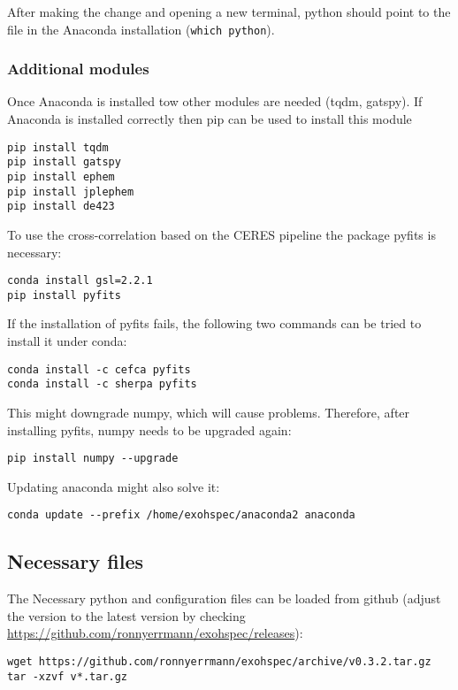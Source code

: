 \documentclass[10pt,a4paper]{article}
\begin{document}
After making the change and opening a new terminal, python should point to the file in the Anaconda installation (\verb|which python|).

\subsubsection{Additional modules}

\noindent Once Anaconda is installed tow other modules are needed (tqdm, gatspy). If Anaconda is installed correctly then pip can be used to install this module
\begin{lstlisting}[style=base]
pip install tqdm
pip install gatspy
pip install ephem
pip install jplephem
pip install de423
\end{lstlisting}

To use the cross-correlation based on the CERES pipeline the package pyfits is necessary:
\begin{lstlisting}[style=base]
conda install gsl=2.2.1
pip install pyfits
\end{lstlisting}

If the installation of pyfits fails, the following two commands can be tried to install it under conda:
\begin{lstlisting}[style=base]
conda install -c cefca pyfits
conda install -c sherpa pyfits
\end{lstlisting}
This might downgrade numpy, which will cause problems. Therefore, after installing pyfits, numpy needs to be upgraded again:
\begin{lstlisting}[style=base]
pip install numpy --upgrade
\end{lstlisting}

Updating anaconda might also solve it:
\begin{lstlisting}[style=base]
conda update --prefix /home/exohspec/anaconda2 anaconda
\end{lstlisting}

\subsection{Necessary files}

\noindent The Necessary python and configuration files can be loaded from github (adjust the version to the latest version by checking \url{https://github.com/ronnyerrmann/exohspec/releases}):
\begin{lstlisting}[style=base]
wget https://github.com/ronnyerrmann/exohspec/archive/v0.3.2.tar.gz
tar -xzvf v*.tar.gz
\end{lstlisting}
\end{document}
